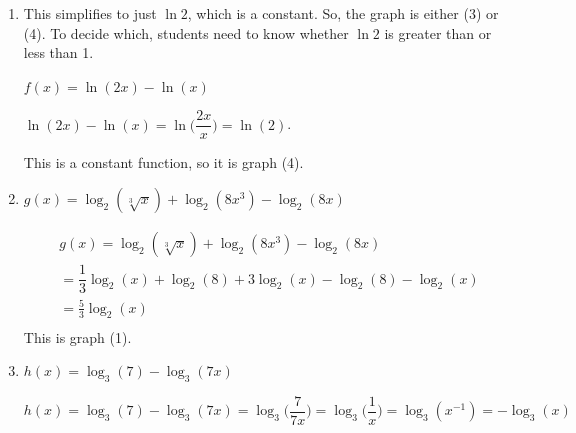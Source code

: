 \documentclass{article}
\begin{document}
\begin{enumerate}
  \begin{enumerate}
  \item

    \begin{workshop}
      This simplifies to just $\ln 2$, which is a constant. So, the graph is either (3) or (4). To decide which, students need to know whether $\ln 2$ is greater than or less than 1.
    \end{workshop}

    \begin{problem}[\vfill]
      $f(x) = \ln(2x) - \ln(x)$
    \end{problem}

    \begin{solution}
           $\ln(2x)-\ln(x) = \ln\Big(\dfrac{2x}{x}\Big) = \ln(2)$. 

    This is a constant function, so it is graph (4).
    \end{solution}

  \item
    \begin{problem}[\vfill]
      $g(x) = \log_2 \left( \sqrt[3]{x} \right) + \log_2 \left( 8 x^3 \right) - \log_2 (8x)$
    \end{problem}

    \begin{solution}
    \begin{align*}
    &  g(x) = \log_2 \left( \sqrt[3]{x} \right) + \log_2 \left( 8 x^3 \right) - \log_2 (8x)  \\
      & =\dfrac{1}{3}\log_2(x) + \log_2(8) + 3\log_2(x) - \log_2(8) - \log_2(x)\\
        & = \frac{5}{3}\log_2(x) \\
    \end{align*}
    This is graph (1). 
    \end{solution}

  \item
    \begin{problem}[\vfill]
      $h(x) = \log_3 (7) - \log_3 (7x)$
    \end{problem}

    \begin{solution}

      $h(x) = \log_3 (7) - \log_3 (7x) = \log_3\Big(\dfrac{7}{7x}\Big) = \log_3\Big(\dfrac{1}{x}\Big) = \log_3(x^{-1}) = -\log_3(x)$
      

\end{solution}
\end{enumerate}
\end{enumerate}
\end{document}
